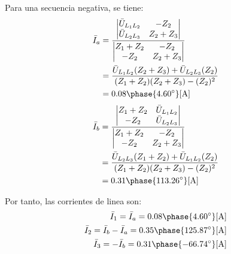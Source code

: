 \documentclass[letter,11pt]{article}
\begin{document}
\begin{enumerate}
Para una secuencia negativa, se tiene:
\begin{equation*}
    \begin{split}
        \bar{I}_a &= \dfrac{\begin{vmatrix}
                        \bar{U}_{L_1L_2} & -Z_2\\
                        \bar{U}_{L_2L_3} & Z_2+Z_3\\
                     \end{vmatrix}}{\begin{vmatrix}
                        Z_1+Z_2 & -Z_2\\
                        -Z_2    & Z_2+Z_3\\
                     \end{vmatrix}}\\
                  &= \dfrac{\bar{U}_{L_1L_2}(Z_2+Z_3)+\bar{U}_{L_2L_3}(Z_2)}
                     {(Z_1+Z_2)(Z_2+Z_3)-(Z_2)^2}\\
                  &= 0.08\phase{4.60^{\circ}}[\text{A}]\\
    \end{split}
\end{equation*}
\begin{equation*}
    \begin{split}
        \bar{I}_b &= \dfrac{\begin{vmatrix}
                        Z_1+Z_2 & \bar{U}_{L_1L_2}\\
                        -Z_2    & \bar{U}_{L_2L_3}\\
                     \end{vmatrix}}{\begin{vmatrix}
                        Z_1+Z_2 & -Z_2\\
                        -Z_2    & Z_2+Z_3\\
                     \end{vmatrix}}\\
                  &= \dfrac{\bar{U}_{L_2L_3}(Z_1+Z_2)+\bar{U}_{L_1L_2}(Z_2)}
                     {(Z_1+Z_2)(Z_2+Z_3)-(Z_2)^2}\\
                  &= 0.31\phase{113.26^{\circ}}[\text{A}]\\
    \end{split}
\end{equation*}

Por tanto, las corrientes de linea son:
\begin{equation*}
    \begin{split}
        \bar{I}_1 = \bar{I}_a = 0.08\phase{4.60^{\circ}}[\text{A}]\\
        \bar{I}_2 = \bar{I}_b-\bar{I}_a = 0.35\phase{125.87^{\circ}}[\text{A}]\\
        \bar{I}_3 = -\bar{I}_b = 0.31\phase{-66.74^{\circ}}[\text{A}]\\
    \end{split}
\end{equation*}

\end{enumerate}
\end{document}
